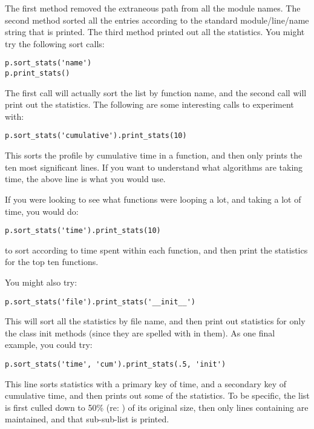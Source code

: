 The first method removed the extraneous path from all the module
names. The second method sorted all the entries according to the
standard module/line/name string that is printed.
The third method printed out
all the statistics.  You might try the following sort calls:

\begin{verbatim}
p.sort_stats('name')
p.print_stats()
\end{verbatim}

The first call will actually sort the list by function name, and the
second call will print out the statistics.  The following are some
interesting calls to experiment with:

\begin{verbatim}
p.sort_stats('cumulative').print_stats(10)
\end{verbatim}

This sorts the profile by cumulative time in a function, and then only
prints the ten most significant lines.  If you want to understand what
algorithms are taking time, the above line is what you would use.

If you were looking to see what functions were looping a lot, and
taking a lot of time, you would do:

\begin{verbatim}
p.sort_stats('time').print_stats(10)
\end{verbatim}

to sort according to time spent within each function, and then print
the statistics for the top ten functions.

You might also try:

\begin{verbatim}
p.sort_stats('file').print_stats('__init__')
\end{verbatim}

This will sort all the statistics by file name, and then print out
statistics for only the class init methods (since they are spelled
with  in them).  As one final example, you could try:

\begin{verbatim}
p.sort_stats('time', 'cum').print_stats(.5, 'init')
\end{verbatim}

This line sorts statistics with a primary key of time, and a secondary
key of cumulative time, and then prints out some of the statistics.
To be specific, the list is first culled down to 50\% (re: )
of its original size, then only lines containing  are
maintained, and that sub-sub-list is printed.

